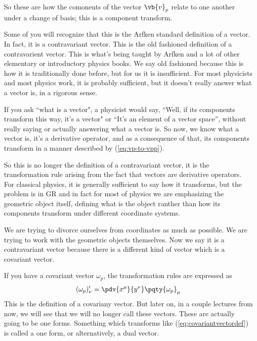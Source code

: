 So these are how the comonents of the vector $\vb{v}_p$ relate to one another under
a change of basis; this is a component transform.

Some of you will recognize that this is the Arfken\cite{Arfken1970} standard definition of a vector. In fact, it is a contravariant vector.
This is the old fashioned definition of a contravarient vector. This is what's being taught by Arfken and a lot 
of other elementary or introductory physics books. We say old fashioned because this is how it is traditionally done 
before,  but for us it is insufficient. For most physicists and most physics work, it is probably sufficient, but it doesn't 
really answer what a vector is, in a rigorous sense.

If you ask ``what is a vector", a physicist would say, ``Well, if its components transform this way, it's a vector" or ``It's an element of a vector space'', without
really saying or actually answering what a vector is. So now, we know what a vector is, it's a derivative
operator, and as a consequence of that, its components transform in a manner described by (\ref{eq:vp-to-vpp}).

So this is no longer the definition of a contravariant vector, it is the transformation rule arising from the fact that
vectors are derivative operators. For classical physics, it is generally sufficient to say how it transforms, but the problem is 
in GR and in fact for most of physics we are emphasizing the geometric object itself, defining
what is the object ranther than how its components transform under different coordinate systems. 

We are trying to divorce ourselves from coordinates as much as possible. We are trying to work with the geometric objects themselves.
Now we say it is a contravariant vector because there is a different kind of vector which is a covariant vector.

If you have a covariant vector $\omega_p$, the transformation rules are expressed as 
\begin{equation}
	\label{eq:covariantvectordef}
	(\omega_p)'_\nu = 
	\pdv{x^\mu}{y^\nu} \pqty{\omega_p}_\mu 
\end{equation}
This is the definition of a covariany vector. But later on, in a couple lectures from now,
we will see that we will no longer call these vectors. These are actually going to be one forms.
Something which transforms like (\ref{eq:covariantvectordef}) is called a one form, or alternatively, a 
dual vector. 

